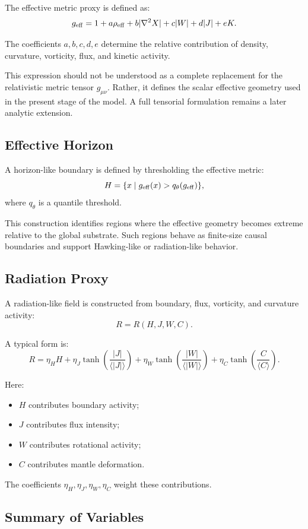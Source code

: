 \documentclass[11pt]{article}
\begin{document}
The effective metric proxy is defined as:
\[
g_{\rm eff}
=
1
+ a\rho_{\rm eff}
+ b|\nabla^2 X|
+ c|W|
+ d|J|
+ eK.
\]

The coefficients $a,b,c,d,e$ determine the relative contribution of density, curvature, vorticity, flux, and kinetic activity.

This expression should not be understood as a complete replacement for the relativistic metric tensor $g_{\mu\nu}$. Rather, it defines the scalar effective geometry used in the present stage of the model. A full tensorial formulation remains a later analytic extension.

\subsection{Effective Horizon}

A horizon-like boundary is defined by thresholding the effective metric:
\[
H = \{x \mid g_{\rm eff}(x) > q_\theta(g_{\rm eff})\},
\]
where $q_\theta$ is a quantile threshold.

This construction identifies regions where the effective geometry becomes extreme relative to the global substrate. Such regions behave as finite-size causal boundaries and support Hawking-like or radiation-like behavior.

\subsection{Radiation Proxy}

A radiation-like field is constructed from boundary, flux, vorticity, and curvature activity:
\[
R = R(H,J,W,C).
\]

A typical form is:
\[
R =
\eta_H H
+ \eta_J \tanh\left(\frac{|J|}{\langle |J| \rangle}\right)
+ \eta_W \tanh\left(\frac{|W|}{\langle |W| \rangle}\right)
+ \eta_C \tanh\left(\frac{C}{\langle C \rangle}\right).
\]

Here:
\begin{itemize}
\item $H$ contributes boundary activity;
\item $J$ contributes flux intensity;
\item $W$ contributes rotational activity;
\item $C$ contributes mantle deformation.
\end{itemize}

The coefficients $\eta_H,\eta_J,\eta_W,\eta_C$ weight these contributions.

\subsection{Summary of Variables}
\end{document}
